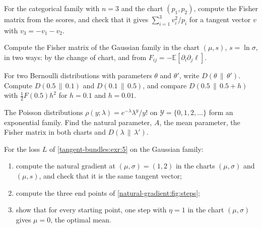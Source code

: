 \begin{notechapter}
\begin{exercise}\label{natural-gradient:exr:2}
For the categorical family with $n = 3$ and the chart $(p_1, p_2)$,
compute the Fisher matrix from the scores, and check that it gives
$\sum_{i=1}^3v_i^2/p_i$ for a tangent vector $v$ with
$v_3 = -v_1 - v_2$.
\end{exercise}

\begin{exercise}\label{natural-gradient:exr:3}
Compute the Fisher matrix of the Gaussian family in the chart
$(\mu, s)$, $s = \ln\sigma$, in two ways: by the change of chart, and
from $F_{ij} = -\mathbb E[\partial_i\partial_j\ell]$.
\end{exercise}

\begin{exercise}\label{natural-gradient:exr:4}
For two Bernoulli distributions with parameters $\theta$ and $\theta'$,
write $D(\theta\,\|\,\theta')$. Compute $D(0.5\,\|\,0.1)$ and
$D(0.1\,\|\,0.5)$, and compare $D(0.5\,\|\,0.5 + h)$ with
$\frac12F(0.5)h^2$ for $h = 0.1$ and $h = 0.01$.
\end{exercise}

\begin{exercise}\label{natural-gradient:exr:5}
The Poisson distributions $\rho(y; \lambda) = e^{-\lambda}\lambda^y/y!$
on $\mathcal Y = \{0, 1, 2, \dots\}$ form an exponential family. Find
the natural parameter, $A$, the mean parameter, the Fisher matrix in
both charts and $D(\lambda\,\|\,\lambda')$.
\end{exercise}

\begin{exercise}\label{natural-gradient:exr:6}
For the loss $L$ of \cref{tangent-bundles:exr:5} on the Gaussian family:
\begin{enumerate}[nosep]
  \item compute the natural gradient at $(\mu, \sigma) = (1, 2)$ in the
        charts $(\mu, \sigma)$ and $(\mu, s)$, and check that it is the
        same tangent vector;
  \item compute the three end points of
        \cref{natural-gradient:fig:steps};
  \item show that for every starting point, one step with $\eta = 1$ in
        the chart $(\mu, \sigma)$ gives $\mu = 0$, the optimal mean.
\end{enumerate}
\end{exercise}


\end{notechapter}
